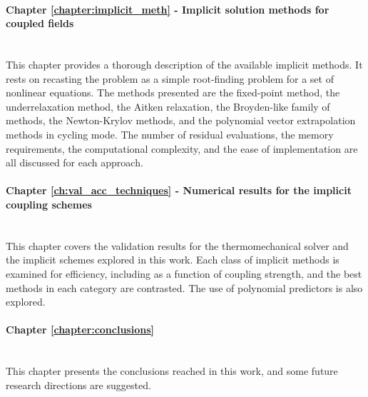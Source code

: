 \paragraph{Chapter \ref{chapter:implicit_meth} - Implicit solution methods for coupled fields}\mbox{}\\
This chapter provides a thorough description of the available implicit methods.
It rests on recasting the problem as a simple root-finding problem for a set of nonlinear equations.
The methods presented are the fixed-point method, the underrelaxation method, the Aitken relaxation, the Broyden-like family of methods, the Newton-Krylov methods, and the polynomial vector extrapolation methods in cycling mode.
The number of residual evaluations, the memory requirements, the computational complexity, and the ease of implementation are all discussed for each approach.

\paragraph{Chapter \ref{ch:val_acc_techniques} - Numerical results for the implicit coupling schemes}\mbox{} \\
This chapter covers the validation results for the thermomechanical solver and the implicit schemes explored in this work.
Each class of implicit methods is examined for efficiency, including as a function of coupling strength, and the best methods in each category are contrasted.
The use of polynomial predictors is also explored.

\paragraph{Chapter \ref{chapter:conclusions}}\mbox{}\\
This chapter presents the conclusions reached in this work, and some future research directions are suggested.

\newpage\null\thispagestyle{blank}\newpage
